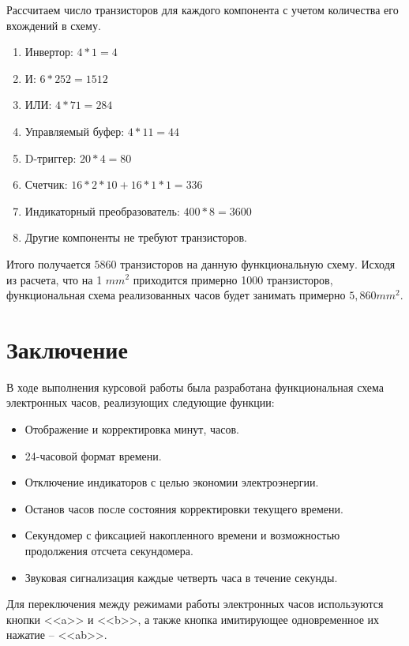 \documentclass[10pt,a4paper,final]{article} %
\begin{document}
Рассчитаем число транзисторов для каждого компонента с учетом количества его вхождений в схему.
\begin{enumerate}[label=]
	\item $\text{Инвертор: } 4 * 1 = 4$ 
	\item $\text{И: }  6 * 252 = 1512$
	\item $\text{ИЛИ: }  4 * 71 = 284$
	\item $\text{Управляемый буфер: }  4 * 11 = 44$
	\item $\text{D-триггер: }  20 * 4 = 80$
	\item $\text{Счетчик: }  16 * 2 * 10 + 16 * 1 * 1 = 336$
	\item $\text{Индикаторный преобразователь: }  400 * 8 = 3600 $
	\item Другие компоненты не требуют транзисторов.
\end{enumerate}
Итого получается  $5860$ транзисторов на данную функциональную схему. Исходя из расчета, что на 1 $mm^2$ приходится примерно 1000 транзисторов, функциональная схема реализованных часов будет занимать примерно $5,860 mm^2$.


\newpage
{}
\section*{Заключение}
В ходе выполнения курсовой работы была разработана функциональная схема электронных часов, реализующих следующие функции:
\begin{itemize}
	\item Отображение и корректировка минут, часов.
	\item 24-часовой формат времени.
	\item Отключение индикаторов с целью экономии электроэнергии.
	\item Останов часов после состояния корректировки текущего времени.
	\item Секундомер с фиксацией накопленного времени и возможностью продолжения отсчета секундомера.
	\item Звуковая сигнализация каждые четверть часа в течение секунды.
\end{itemize}
Для переключения между режимами работы электронных часов используются кнопки <<a>> и <<b>>, а также кнопка имитирующее одновременное  их нажатие -- <<ab>>.
\end{document}
